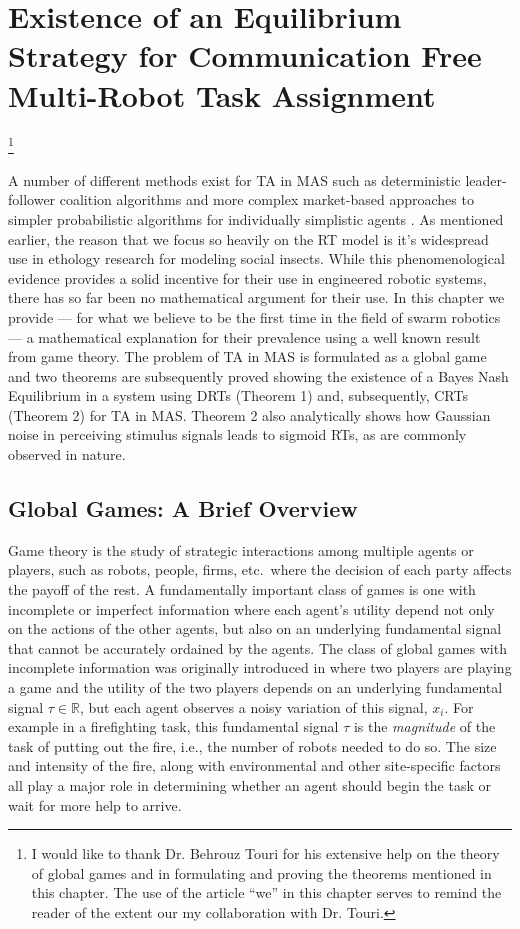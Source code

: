 \documentclass[12pt]{book}
\newcommand\blfootnote[1]{%
  \begingroup
  \renewcommand\thefootnote{}\footnote{#1}%
  \addtocounter{footnote}{-1}%
  \endgroup
}
\begin{document}
\chapter{Existence of an Equilibrium Strategy for Communication Free Multi-Robot Task Assignment}\blfootnote{I would like to thank Dr. Behrouz Touri for his extensive help on the theory of global games and in formulating and proving the theorems mentioned in this chapter. The use of the article ``we'' in this chapter serves to remind the reader of the extent our my collaboration with Dr. Touri.}\label{ch:existeqrtm}
A number of different methods exist for TA in MAS such as deterministic leader-follower coalition algorithms \cite{Chen2011} and more complex market-based approaches \cite{Amstutz2008} to simpler probabilistic algorithms for individually simplistic agents \cite{Dantu2012}. As mentioned earlier, the reason that we focus so heavily on the RT model is it's widespread use in ethology research for modeling social insects. While this phenomenological evidence provides a solid incentive for their use in engineered robotic systems, there has so far been no mathematical argument for their use. In this chapter we provide --- for what we believe to be the first time in the field of swarm robotics --- a mathematical explanation for their prevalence using a well known result from game theory. The problem of TA in MAS is formulated as a global game and two theorems are subsequently proved showing the existence of a Bayes Nash Equilibrium in a system using DRTs (Theorem 1) and, subsequently, CRTs (Theorem 2) for TA in MAS. Theorem 2 also analytically shows how Gaussian noise in perceiving stimulus signals leads to sigmoid RTs, as are commonly observed in nature.

\section{Global Games: A Brief Overview}\label{sec:ggoverview}
Game theory is the study of strategic interactions among multiple agents or players, such as robots, people, firms, etc.\ where the decision of each party affects the payoff of the rest. A fundamentally important class of games is one with incomplete or imperfect information where each agent's utility depend not only on the actions of the other agents, but also on an underlying fundamental signal that cannot be accurately ordained by the agents. The class of global games with incomplete information was originally introduced in \cite{Carlsson1993} where two players are playing a game and the utility of the two players depends on an underlying fundamental signal $\tau \in \mathbb{R}$, but each agent observes a noisy variation of this signal, $x_i$. For example in a firefighting task, this fundamental signal $\tau$ is the \emph{magnitude} of the task of putting out the fire, i.e., the number of robots needed to do so. The size and intensity of the fire, along with environmental and other site-specific factors all play a major role in determining whether an agent should begin the task or wait for more help to arrive.
\end{document}

